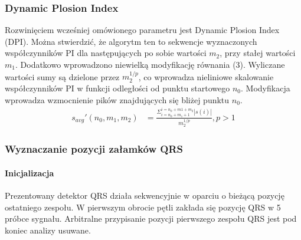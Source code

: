 \documentclass[a4paper,10pt]{article} %
\begin{document}
\subsubsection{Dynamic Plosion Index}
Rozwinięciem wcześniej omówionego parametru jest Dynamic Plosion Index (DPI). Można stwierdzić, że algorytm ten to sekwencje wyznaczonych współczynników PI dla następujących po sobie wartości $m_2$, przy stałej wartości $m_1$. Dodatkowo wprowadzono niewielką modyfikację równania (3). Wyliczane wartości sumy są dzielone przez $m_2^{1/p}$, co wprowadza nieliniowe skalowanie współczynników PI w funkcji odległości od punktu startowego $n_0$. Modyfikacja wprowadza wzmocnienie pików znajdujących się bliżej punktu $n_0$.
\begin{align}
 s_{avg}'(n_0,m_1,m_2) &= \frac{\Sigma_{i=n_0+m_1+1}^{i=n_0+m1+m_2}|s(i)|}{m_2^{1/p}}, p>1
\end{align}

\subsubsection{Wyznaczanie pozycji załamków QRS}
\paragraph{Inicjalizacja}
Prezentowany detektor QRS działa sekwencyjnie w oparciu o bieżącą pozycję ostatniego zespołu. W pierwszym obrocie pętli zakłada się pozycję QRS w 5 próbce sygnału. Arbitralne przypisanie pozycji pierwszego zespołu QRS jest pod koniec analizy usuwane. 
\end{document}
